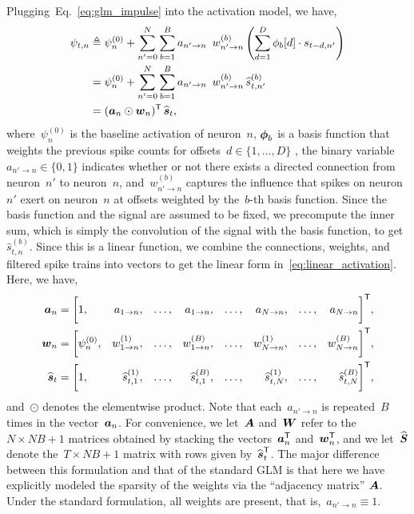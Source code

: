 Plugging~Eq.~\ref{eq:glm_impulse} into the activation model, we have,
\begin{align}
  \nonumber
  \psi_{t,n} &\triangleq \psi_n^{(0)}  +                 
               \sum_{n'=0}^N  \sum_{b=1}^B a_{n' \to n} \, w_{n' \to n}^{(b)}
               \left( \sum_{d=1}^{D} \phi_{b}[d] \cdot s_{t-d, n'} \right) \\
  \nonumber
             &= \psi_n^{(0)}  + \sum_{n'=0}^N \sum_{b=1}^B a_{n' \to n} \, w_{n' \to n}^{(b)} \, \widehat{s}_{t,n'}^{(b)} \\
  \label{eq:linear_activation}
             &= (\ba_{n} \odot \bw_n)^\trans \, \widehat{\bs}_t,
\end{align}
where~$\psi_n^{(0)}$ is the baseline activation of neuron~$n$,
$\boldsymbol{\phi}_{b}$ is a basis function that weights the previous spike counts
for offsets~${d \in \{1, \ldots, D\}}$ , the binary variable~${a_{n'
    \to n} \in \{0,1\}}$ indicates whether or not there exists a
directed connection from neuron~$n'$ to neuron~$n$, and~$w_{n' \to
  n}^{(b)}$ captures the influence that spikes on neuron~$n'$ exert on
neuron~$n$ at offsets weighted by the~$b$-th basis function.  Since
the basis function and the signal are assumed to be fixed, we
precompute the inner sum, which is simply the convolution of the
signal with the basis function, to get~$\widehat{s}_{t,n}^{(b)}$.
Since this is a linear function, we combine the connections,
weights, and filtered spike trains into vectors to get the linear form
in~\eqref{eq:linear_activation}.  Here, we have,
\begin{align*}
  \boldsymbol{a}_n &=
    \bigg[
      1,  
      & a_{1 \to n}, & & \ldots, & & a_{1 \to n}, 
      & & \ldots, &
      &a_{N \to n}, & & \ldots, & &a_{N \to n} 
    &\bigg]^{\mathsf{T}}, \\
  \boldsymbol{w}_n &=
    \bigg[
      \psi_n^{(0)}, 
      &w_{1 \to n}^{(1)}, & & \ldots, & &w_{1 \to n}^{(B)}, 
      & &\ldots, &
      &w_{N \to n}^{(1)}, & & \ldots, & &w_{N \to n}^{(B)} 
      &\bigg]^{\mathsf{T}}, \\
  \widehat{\boldsymbol{s}}_t &=
    \bigg[
      1, 
      &\widehat{s}_{t,1}^{(1)}, & & \ldots, & &\widehat{s}_{t,1}^{(B)}, 
      & &\ldots, &
      &\widehat{s}_{t,N}^{(1)}, & & \ldots, & &\widehat{s}_{t,N}^{(B)} 
    &\bigg]^{\mathsf{T}},
\end{align*}
\sloppy
and~$\odot$ denotes the elementwise product. Note that each~$a_{n' \to n}$ 
is repeated~$B$ times in the vector~$\boldsymbol{a}_{n}$. For convenience, we
let~$\boldsymbol{A}$ and~$\boldsymbol{W}$ refer to the~${N \times NB+1}$ matrices obtained
by stacking the vectors~$\boldsymbol{a}_n^{\mathsf{T}}$ and~$\boldsymbol{w}_n^{\mathsf{T}}$, and we
let~$\widehat{\boldsymbol{S}}$ denote the~${T \times NB+1}$ matrix with rows
given by~$\widehat{\boldsymbol{s}}_t^{\mathsf{T}}$. The major difference between this formulation and that of the standard 
GLM is that here we have explicitly modeled the sparsity of the 
weights via the ``adjacency matrix'' $\boldsymbol{A}$. Under the standard 
formulation, all weights are present, that is,~${a_{n' \to n} \equiv 1}$.

